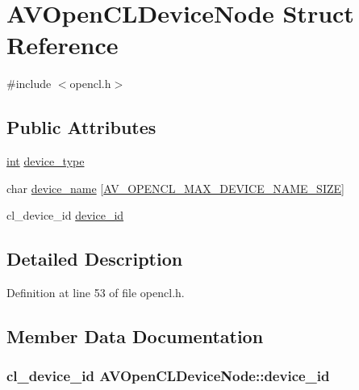 \hypertarget{struct_a_v_open_c_l_device_node}{}\section{A\+V\+Open\+C\+L\+Device\+Node Struct Reference}
\label{struct_a_v_open_c_l_device_node}


{\ttfamily \#include $<$opencl.\+h$>$}

\subsection*{Public Attributes}
\begin{DoxyCompactItemize}
\item 
\hyperlink{xmltok_8h_a5a0d4a5641ce434f1d23533f2b2e6653}{int} \hyperlink{struct_a_v_open_c_l_device_node_aa92cf6d76c74ab01103c6a0ce00f43ae}{device\+\_\+type}
\item 
char \hyperlink{struct_a_v_open_c_l_device_node_ac8b30e51e84b36c28af5a538619062cb}{device\+\_\+name} \mbox{[}\hyperlink{opencl_8h_a01979f9f7a5866c4e8e3019d828eb562}{A\+V\+\_\+\+O\+P\+E\+N\+C\+L\+\_\+\+M\+A\+X\+\_\+\+D\+E\+V\+I\+C\+E\+\_\+\+N\+A\+M\+E\+\_\+\+S\+I\+ZE}\mbox{]}
\item 
cl\+\_\+device\+\_\+id \hyperlink{struct_a_v_open_c_l_device_node_a19b6053332488820b701c5e1504f6594}{device\+\_\+id}
\end{DoxyCompactItemize}


\subsection{Detailed Description}


Definition at line 53 of file opencl.\+h.



\subsection{Member Data Documentation}
\subsubsection[{\texorpdfstring{device\+\_\+id}{device_id}}]{\setlength{\rightskip}{0pt plus 5cm}cl\+\_\+device\+\_\+id A\+V\+Open\+C\+L\+Device\+Node\+::device\+\_\+id}\hypertarget{struct_a_v_open_c_l_device_node_a19b6053332488820b701c5e1504f6594}{}\label{struct_a_v_open_c_l_device_node_a19b6053332488820b701c5e1504f6594}


